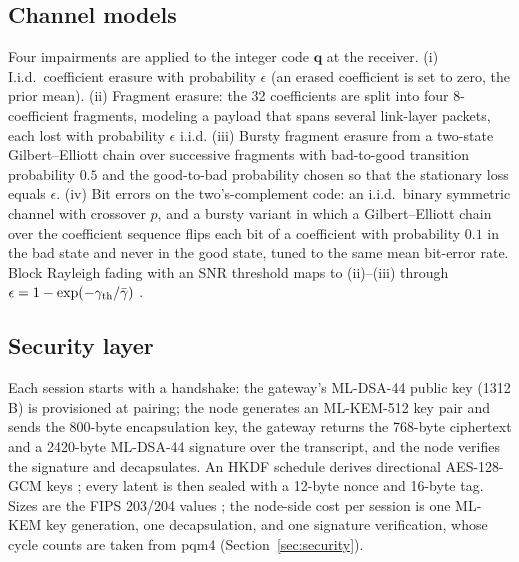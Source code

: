 \documentclass[journal]{IEEEtran}
\newcommand{\bq}{\mathbf{q}}
\begin{document}
\subsection{Channel models}\label{sec:channelmodel}
Four impairments are applied to the integer code $\bq$ at the receiver. (i) I.i.d.\ coefficient erasure with probability $\epsilon$ (an erased coefficient is set to zero, the prior mean). (ii) Fragment erasure: the 32 coefficients are split into four 8-coefficient fragments, modeling a payload that spans several link-layer packets, each lost with probability $\epsilon$ i.i.d. (iii) Bursty fragment erasure from a two-state Gilbert--Elliott chain \cite{gilbert1960,elliott1963} over successive fragments with bad-to-good transition probability $0.5$ and the good-to-bad probability chosen so that the stationary loss equals $\epsilon$. (iv) Bit errors on the two's-complement code: an i.i.d.\ binary symmetric channel with crossover $p$, and a bursty variant in which a Gilbert--Elliott chain over the coefficient sequence flips each bit of a coefficient with probability $0.1$ in the bad state and never in the good state, tuned to the same mean bit-error rate. Block Rayleigh fading with an SNR threshold maps to (ii)--(iii) through $\epsilon=1-\exp(-\gamma_{\rm th}/\bar\gamma)$ \cite{gomez2012}.

\subsection{Security layer}\label{sec:secmethod}
Each session starts with a handshake: the gateway's ML-DSA-44 public key (1312 B) is provisioned at pairing; the node generates an ML-KEM-512 key pair and sends the 800-byte encapsulation key, the gateway returns the 768-byte ciphertext and a 2420-byte ML-DSA-44 signature over the transcript, and the node verifies the signature and decapsulates. An HKDF schedule \cite{hkdf} derives directional AES-128-GCM keys \cite{gcm}; every latent is then sealed with a 12-byte nonce and 16-byte tag. Sizes are the FIPS 203/204 values \cite{fips203,fips204}; the node-side cost per session is one ML-KEM key generation, one decapsulation, and one signature verification, whose cycle counts are taken from pqm4 \cite{pqm4} (Section~\ref{sec:security}).
\end{document}
